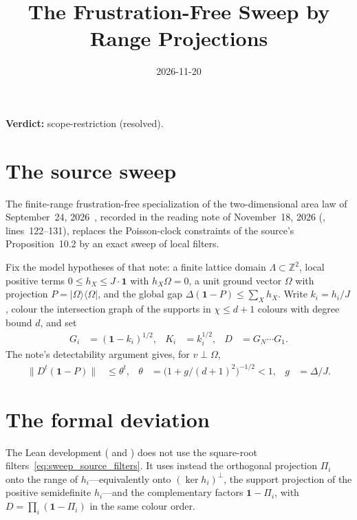 \documentclass{article}
\title{The Frustration-Free Sweep by Range Projections}
\author{}
\date{2026-11-20}
\providecommand{\gapnote}[2]{%
    \par\noindent\textbf{Verdict:} #1 (#2).\par}
\providecommand{\norm}[1]{\lVert #1\rVert}
\providecommand{\ket}[1]{|#1\rangle}
\providecommand{\bra}[1]{\langle #1|}
\begin{document}
\maketitle
\gapnote{scope-restriction}{resolved}

\section{The source sweep}

The finite-range frustration-free specialization of the two-dimensional
area law of September~24, 2026~\cite{OpenAI2026AreaLaw}, recorded in the
reading note of November~18, 2026
(,
lines~122--131), replaces the Poisson-clock constraints of the source's
Proposition~10.2 by an exact sweep of local filters.

Fix the model hypotheses of that note: a finite lattice domain
$\Lambda\subset\mathbb Z^2$, local positive terms $0\le h_X\le J\cdot\mathbf 1$
with $h_X\Omega=0$, a unit ground vector $\Omega$ with projection
$P=\ket\Omega\bra\Omega$, and the global gap
$\Delta(\mathbf 1-P)\le\sum_X h_X$. Write $k_i=h_i/J$, colour the intersection
graph of the supports in $\chi\le d+1$ colours with degree bound $d$, and set
\begin{align}
    G_i    & =(\mathbf 1-k_i)^{1/2}, &
    K_i    & =k_i^{1/2},             &
    D      & =G_N\cdots G_1 .
    \label{eq:sweep_source_filters}
\end{align}
The note's detectability argument gives, for $v\perp\Omega$,
\begin{align}
    \norm{D^t(\mathbf 1-P)} & \le\theta^t, &
    \theta                  & =\bigl(1+g/(d+1)^2\bigr)^{-1/2}<1, &
    g                       & =\Delta/J.
    \label{eq:sweep_source_bound}
\end{align}

\section{The formal deviation}

The Lean development
( and
) does not use
the square-root filters~\eqref{eq:sweep_source_filters}. It uses instead the
orthogonal projection $\Pi_i$ onto the range of $h_i$---equivalently onto
$(\ker h_i)^\perp$, the support projection of the positive semidefinite
$h_i$---and the complementary factors $\mathbf 1-\Pi_i$, with
$D=\prod_i(\mathbf 1-\Pi_i)$ in the same colour order.
\end{document}
